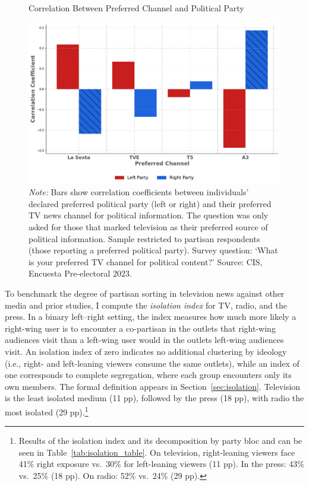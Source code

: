\documentclass[12pt]{article}
\begin{document}
	
	\begin{figure}[!htbp]
		\centering
		\caption{Correlation Between Preferred Channel and Political Party}
		\includegraphics[width=120mm]{figures/corr_party_channel3}
		\caption*{\small \textit{Note:} Bars show correlation coefficients between individuals’ declared preferred political party (left or right) and their preferred TV news channel for political information. The question was only asked for those that marked television as their preferred source of political information. Sample restricted to partisan respondents (those reporting a preferred political party). Survey question: ‘What is your preferred TV channel for political content?’ Source: CIS, Encuesta Pre-electoral 2023.}
		\label{fig:opinion}
	\end{figure}
	
	

	
	
	
	To benchmark the degree of partisan sorting in television news against other media and prior studies, I compute the \emph{isolation index} \citep{gentzkow_isolation} for TV, radio, and the press. In a binary left–right setting, the index measures how much more likely a right-wing user is to encounter a co-partisan in the outlets that right-wing audiences visit than a left-wing user would in the outlets left-wing audiences visit. An isolation index of zero indicates no additional clustering by ideology (i.e., right- and left-leaning viewers consume the same outlets), while an index of one corresponds to complete segregation, where each group encounters only its own members.	The formal definition appears in  Section~\ref{sec:isolation}. Television is the least isolated medium (11 pp), followed by the press (18 pp), with radio the most isolated (29 pp).\footnote{Results of the isolation index and its decomposition by party bloc and can be seen in  Table~\ref{tab:isolation_table}. On television, right-leaning viewers face 41\% right exposure vs.\ 30\% for left-leaning viewers (11 pp). In the press: 43\% vs.\ 25\% (18 pp). On radio: 52\% vs.\ 24\% (29 pp).}
	
\end{document}
